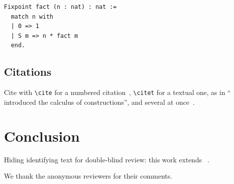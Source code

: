 \documentclass[
  lncs,         %
]{venue}
\begin{document}
\begin{lstlisting}[language=Coq]
Fixpoint fact (n : nat) : nat :=
  match n with
  | 0 => 1
  | S m => n * fact m
  end.
\end{lstlisting}

\subsection{Citations}

Cite with \verb|\cite| for a numbered citation~\cite{hoare1969axiomatic},
\verb|\citet| for a textual one, as in ``\citet{coquand1988calculus}
introduced the calculus of constructions'', and several at
once~\cite{knuth1984texbook,lamport1994latex,bertot2004coqart,demoura2008z3}.

\section{Conclusion}

Hiding identifying text for double-blind review: this work extends
~\cite{leroy2006compcert}.

\begin{acks}
  We thank the anonymous reviewers for their comments.
\end{acks}



\end{document}
